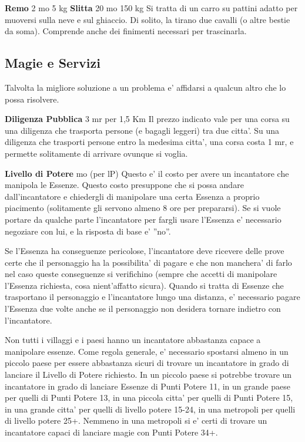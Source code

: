 \documentclass[a4paper,11pt,twoside,openany]{book}
\begin{document}
{\textbf{Remo} 2 mo 5 kg \textbf{Slitta} 20 mo 150 kg Si tratta di un carro su pattini adatto per muoversi sulla neve e sul ghiaccio. Di solito, la tirano due cavalli (o altre bestie da soma). Comprende anche dei finimenti necessari per trascinarla.

\pagebreak

\subsection{Magie e Servizi}

\label{magie-e-servizi}

Talvolta la migliore soluzione a un problema e' affidarsi a qualcun altro che lo possa risolvere.

\textbf{Diligenza Pubblica} 3 mr per 1,5 Km Il prezzo indicato vale per una corsa su una diligenza che trasporta persone (e bagagli leggeri) tra due citta'. Su una diligenza che trasporti persone entro la medesima citta', una corsa costa 1 mr, e permette solitamente di arrivare ovunque si voglia.

\textbf{Livello di Potere}  mo (per lP) Questo e' il costo per avere un incantatore che manipola le Essenze. Questo costo presuppone che si possa andare dall'incantatore e chiedergli di manipolare una certa Essenza a proprio piacimento (solitamente gli servono almeno 8 ore per prepararsi). Se si vuole portare da qualche parte l'incantatore per fargli usare l'Essenza e' necessario negoziare con lui, e la risposta di base e' ''no''.

Se l'Essenza ha conseguenze pericolose, l'incantatore deve ricevere delle prove certe che il personaggio ha la possibilita' di pagare e che non manchera' di farlo nel caso queste conseguenze si verifichino (sempre che accetti di manipolare l'Essenza richiesta, cosa nient'affatto sicura). Quando si tratta di Essenze che trasportano il personaggio e l'incantatore lungo una distanza, e' necessario pagare l'Essenza due volte anche se il personaggio non desidera tornare indietro con l'incantatore.

Non tutti i villaggi e i paesi hanno un incantatore abbastanza capace a manipolare essenze. Come regola generale, e' necessario spostarsi almeno in un piccolo paese per essere abbastanza sicuri di trovare un incantatore in grado di lanciare il Livello di Potere richiesto. In un piccolo paese si potrebbe trovare un incantatore in grado di lanciare Essenze di Punti Potere 11, in un grande paese per quelli di Punti Potere 13, in una piccola citta' per quelli di Punti Potere 15, in una grande citta' per quelli di livello potere 15-24, in una metropoli per quelli di livello potere 25+. Nemmeno in una metropoli si e' certi di trovare un incantatore capaci di lanciare magie con Punti Potere 34+. 

}
\end{document}
